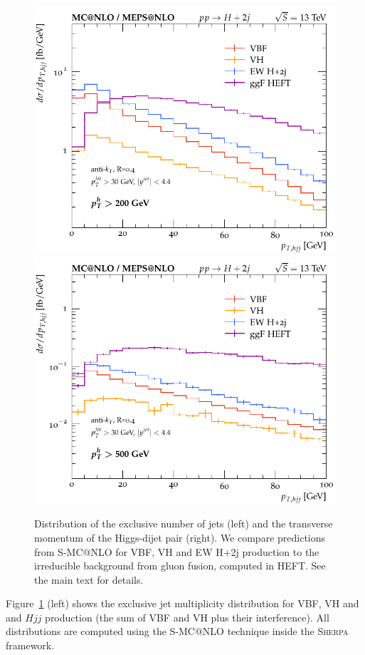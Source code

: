 \documentclass[10pt,prd,fleqn,superscriptaddress,notitlepage,nofootinbib,preprintnumbers,nobalancelastpage]{revtex4-1}
\newcommand{\Sherpa}{\textsc{Sherpa}\xspace}
\newcommand{\VBF}{VBF\xspace}
\newcommand{\VH}{VH\xspace}
\begin{document}
\begin{figure}[p]
\begin{minipage}{.45\textwidth}
    \includegraphics[width=\textwidth]{figures/channels/pthjj12_pth200.pdf}
    \includegraphics[width=\textwidth]{figures/channels/pthjj12_pth500.pdf}
  \end{minipage}
\caption{Distribution of the exclusive number of jets (left) and the transverse momentum of the Higgs-dijet pair (right).
We compare predictions from S-MC@NLO for VBF, VH and EW H+2j production to the irreducible background
from gluon fusion, computed in HEFT. See the main text for details.}
\label{fig:incl_njets}
\end{figure}
Figure~\ref{fig:incl_njets} (left) shows the exclusive jet multiplicity distribution for \VBF, \VH and and $Hjj$ production (the sum of \VBF and \VH plus their interference). All distributions are computed using the S-MC@NLO technique inside the \Sherpa{} framework.
\end{document}
